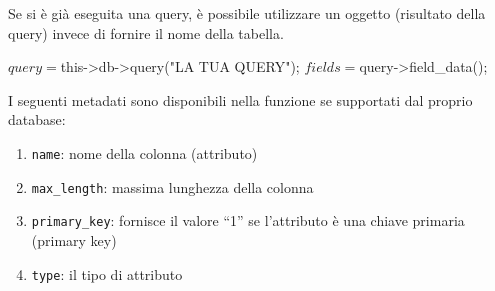 \begin{itemize}
Se si è già eseguita una query, è possibile utilizzare un oggetto (risultato della query) invece di fornire il nome della tabella.

\begin{code}
$query = $this->db->query("LA TUA QUERY");
$fields = $query->field_data();
\end{code}

I seguenti metadati sono disponibili nella funzione se supportati dal proprio database:

\begin{enumerate}
\item \verb|name|: nome della colonna (attributo)
\item \verb|max_length|: massima lunghezza della colonna
\item \verb|primary_key|: fornisce il valore ``1'' se l'attributo è una chiave primaria (primary key)
\item \verb|type|: il tipo di attributo
\end{enumerate}
\end{itemize}
